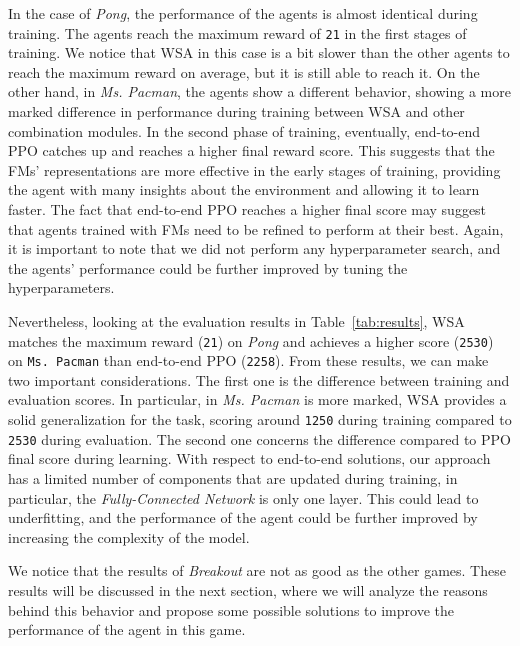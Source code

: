 In the case of \textit{Pong}, the performance of the agents is almost identical during training.
The agents reach the maximum reward of \texttt{21} in the first stages of training.
We notice that WSA in this case is a bit slower than the other agents to reach the maximum reward on average, but it is still able to reach it.
On the other hand, in \textit{Ms. Pacman}, the agents show a different behavior, showing a more marked difference in performance during training between WSA and other combination modules.
In the second phase of training, eventually, end-to-end PPO catches up and reaches a higher final reward score.
This suggests that the FMs' representations are more effective in the early stages of training, providing the agent with many insights about the environment and allowing it to learn faster.
The fact that end-to-end PPO reaches a higher final score may suggest that agents trained with FMs need to be refined to perform at their best.
Again, it is important to note that we did not perform any hyperparameter search, and the agents' performance could be further improved by tuning the hyperparameters.

Nevertheless, looking at the evaluation results in Table~\ref{tab:results}, WSA matches the maximum reward (\texttt{21}) on \textit{Pong} and achieves a higher score (\texttt{2530}) on \texttt{Ms. Pacman} than end-to-end PPO (\texttt{2258}).
From these results, we can make two important considerations.
The first one is the difference between training and evaluation scores.
In particular, in \textit{Ms. Pacman} is more marked, WSA provides a solid generalization for the task, scoring around \texttt{1250} during training compared to \texttt{2530} during evaluation.
The second one concerns the difference compared to PPO final score during learning.
With respect to end-to-end solutions, our approach has a limited number of components that are updated during training, in particular, the \textit{Fully-Connected Network} is only one layer.
This could lead to underfitting, and the performance of the agent could be further improved by increasing the complexity of the model.

We notice that the results of \textit{Breakout} are not as good as the other games.
These results will be discussed in the next section, where we will analyze the reasons behind this behavior and propose some possible solutions to improve the performance of the agent in this game.



